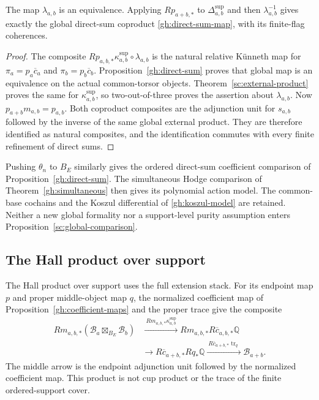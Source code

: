 \begin{proposition}\label{sc:global-comparison}
The map $\lambda_{a,b}$ is an equivalence. Applying $Rp_{a+b,*}$
to $\Delta^{\mathrm{sup}}_{a,b}$ and then $\lambda_{a,b}^{-1}$
gives exactly the global direct-sum coproduct
\eqref{gh:direct-sum-map}, with its finite-flag coherences.
\end{proposition}
\begin{proof}
The composite
$Rp_{a,b,*}\kappa^{\mathrm{sup}}_{a,b}\circ\lambda_{a,b}$
is the natural relative K\"unneth map for
$\pi_a=p_a\overline c_a$ and $\pi_b=p_b\overline c_b$.
Proposition~\ref{gh:direct-sum} proves that global map is an
equivalence on the actual common-torsor objects.
Theorem~\ref{sc:external-product} proves the same for
$\kappa^{\mathrm{sup}}_{a,b}$, so two-out-of-three proves the
assertion about $\lambda_{a,b}$.
Now $p_{a+b}m_{a,b}=p_{a,b}$. Both coproduct composites are
the adjunction unit for $s_{a,b}$ followed by the inverse of the
same global external product. They are therefore identified as
natural composites, and the identification commutes with every
finite refinement of direct sums.
\end{proof}

Pushing $\theta_n$ to $B_E$ similarly gives the ordered direct-sum
coefficient comparison of Proposition~\ref{gh:direct-sum}.
The simultaneous Hodge comparison of Theorem~\ref{gh:simultaneous}
then gives its polynomial action model. The common-base cochains
and the Koszul differential of \eqref{gh:koszul-model} are retained.
Neither a new global formality nor a support-level purity
assumption enters Proposition~\ref{sc:global-comparison}.

\subsection{The Hall product over support}

The Hall product over support uses the full extension stack.
For its endpoint map $p$ and proper middle-object map $q$, the
normalized coefficient map of Proposition~\ref{gh:coefficient-maps}
and the proper trace give the composite
\begin{equation}\label{sc:hall-product}
 \begin{split}
 Rm_{a,b,*}(\mathcal B_a\boxtimes_{B_E}\mathcal B_b)
 &\xrightarrow{\ Rm_{a,b,*}\kappa^{\mathrm{sup}}_{a,b}\ }
          Rm_{a,b,*}R\overline c_{a,b,*}\mathbb Q\\
 &\longrightarrow R\overline c_{a+b,*}Rq_*\mathbb Q
 \xrightarrow{\ R\overline c_{a+b,*}\operatorname{tr}_q\ }
          \mathcal B_{a+b}.
 \end{split}
\end{equation}
The middle arrow is the endpoint adjunction unit followed by the
normalized coefficient map. This product is not cup product or
the trace of the finite ordered-support cover.

